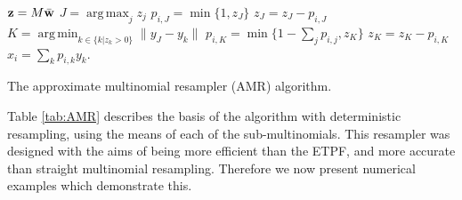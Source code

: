 \documentclass[final]{siamltex}
\renewcommand{\b}[1]{{\bf #1}}
\DeclareMathOperator*{\argmin}{arg\,min}
\DeclareMathOperator*{\argmax}{arg\,max}
\begin{document}
\begin{table}
\begin{mdframed}
\begin{algorithmic}
\STATE $\b{z} = M\bar{\b{w}}$
\STATE $J = \argmax_j z_j$
\STATE $p_{i,J} = \min\{1,z_J\}$
\STATE $z_J = z_J - p_{i,J}$
\STATE $K = \argmin_{k \in \{k|z_k>0\}} \|y_J - y_k\|$
\STATE $p_{i,K} = \min\{1-\sum_j p_{i,j}, z_K\}$
\STATE $z_K = z_K - p_{i,K}$
\ENDWHILE
\STATE $x_i = \sum_k p_{i,k}y_k$.
\ENDFOR
\end{algorithmic}
\end{mdframed}
\caption{The approximate multinomial resampler (AMR) algorithm.\label{tab:AMR}}
\end{table}

Table \ref{tab:AMR} describes the basis of the algorithm with
deterministic resampling, using the means of each of the
sub-multinomials. This resampler was designed with the aims of being
more efficient than the ETPF, and more accurate than straight multinomial
resampling. Therefore we now present numerical examples which
demonstrate this.
\end{document}
